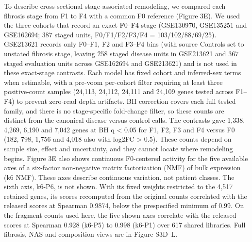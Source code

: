 To describe cross-sectional stage-associated remodeling, we compared each fibrosis stage from F1 to F4 with a common F0 reference (Figure 3E). We used the three cohorts that record an exact F0--F4 stage (GSE130970, GSE135251 and GSE162694; 387 staged units, F0/F1/F2/F3/F4 = 103/102/88/69/25). GSE213621 records only F0--F1, F2 and F3--F4 bins (with source Controls set to unstated fibrosis stage, leaving 258 staged disease units in GSE213621 and 367 staged evaluation units across GSE162694 and GSE213621) and is not used in these exact-stage contrasts. Each model has fixed cohort and inferred-sex terms when estimable, with a pre-voom per-cohort filter requiring at least three positive-count samples (24,113, 24,112, 24,111 and 24,109 genes tested across F1--F4) to prevent zero-read depth artifacts. BH correction covers each full tested family, and there is no stage-specific fold-change filter, so these counts are distinct from the canonical disease-versus-control calls. The contrasts gave 1,338, 4,269, 6,190 and 7,042 genes at BH q \textless{} 0.05 for F1, F2, F3 and F4 versus F0 (182, 798, 1,756 and 4,018 also with \textbar log2FC\textbar{} \textgreater{} 0.5). These counts depend on sample size, effect and uncertainty, and they cannot locate where remodeling begins. Figure 3E also shows continuous F0-centered activity for the five available axes of a six-factor non-negative matrix factorization (NMF) of bulk expression (k6 NMF). These axes describe continuous variation, not patient classes. The sixth axis, k6-P6, is not shown. With its fixed weights restricted to the 4,517 retained genes, its scores recomputed from the original counts correlated with the released scores at Spearman 0.9874, below the prespecified minimum of 0.99. On the fragment counts used here, the five shown axes correlate with the released scores at Spearman 0.928 (k6-P5) to 0.998 (k6-P1) over 617 shared libraries. Full fibrosis, NAS and composition views are in Figure S3D--L.

